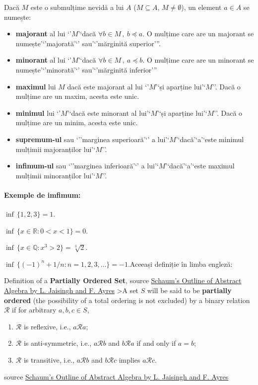 \documentclass[letterpaper,10pt,english]{/usr/local/lib/python2.7/dist-packages/sphinx/texinputs/sphinxhowto}
\begin{document}
Dacă $M$ este o submulțime nevidă a lui $A$ ($M\subseteq A$,
$M\neq\emptyset$), un element $a\in A$ se numește:

\begin{itemize}
\itemsep1pt\parskip0pt
\item
  \textbf{majorant} al lui `'$M$'`dacă $\forall b\in M\,,\ b\preceq a$.
  O mulțime care are un majorant se numește'`'majorată'`'
  sau'`'mărginită superior'''.
\item
  \textbf{minorant} al lui `'$M$'`dacă $\forall b\in M\,,\ a\preceq b$.
  O mulțime care are un minorant se numește'`'minorată'`'
  sau'`'mărginită inferior'''
\item
  \textbf{maximul} lui $M$ dacă este majorant al lui `'$M$'`și aparține
  lui'`$M$''. Dacă o mulțime are un maxim, acesta este unic.
\item
  \textbf{minimul} lui `'$M$'`dacă este minorant al lui'`$M$'`și
  aparține lui'`$M$''. Dacă o mulțime are un minim, acesta este unic.
\item
  \textbf{supremum-ul} sau `''marginea superioară'`' a
  lui'`$M$'`dacă'`a'`este minimul mulțimii majoranților lui'`$M$''.
\item
  \textbf{infimum-ul} sau `''marginea inferioară'`' a
  lui'`$M$'`dacă'`a'`este maximul mulțimii minoranților lui'`$M$''.
\end{itemize}\paragraph{Exemple de imfimum:}\label{exemple-de-imfimum}

$\inf\, \{1, 2, 3\} = 1.$

$\inf\, \{ x \in \mathbb{R} : 0 < x < 1 \}  =  0.$

$\inf\, \{ x \in \mathbb{Q} : x^3 > 2 \} = \sqrt[3]{2}.$

$\inf\, \{ (-1)^n + 1/n : n = 1, 2, 3, \dots \} = -1.$Aceeași definiție în limba engleză:

Definition of a \textbf{Partially Ordered Set}, source
\href{http://www.amazon.com/Schaums-Outline-Abstract-Algebra-Outlines/dp/0071403272}{Schaum's
Outline of Abstract Algebra by L. Jaisingh and F. Ayres} \textgreater{}A
set $S$ will be said to be \textbf{partially ordered} (the possibility
of a total ordering is not excluded) by a binary relation $\mathcal{R}$
if for arbitrary $a, b, c \in S$,

\begin{enumerate}
\def\labelenumi{\arabic{enumi}.}
\itemsep1pt\parskip0pt
\item
  $\mathcal{R}$ is reflexive, i.e., $a \mathcal{R} a$;
\item
  $\mathcal{R}$ is anti-symmetric, i.e., $a \mathcal{R} b$ and
  $b \mathcal{R} a$ if and only if $a = b$;
\item
  $\mathcal{R}$ is transitive, i.e., $a \mathcal{R} b$ and
  $b \mathcal{R} c$ implies $a \mathcal{R} c$.
\end{enumerate}source
\href{http://www.amazon.com/Schaums-Outline-Abstract-Algebra-Outlines/dp/0071403272}{Schaum's
Outline of Abstract Algebra by L. Jaisingh and F. Ayres}
\end{document}
